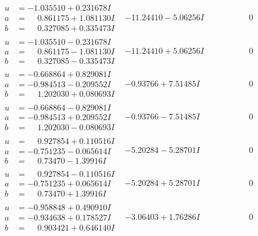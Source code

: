 \documentclass[1p]{elsarticle_modified}
\theoremstyle{definition}
\begin{document}
$$\begin{array}{c|c|c}
\begin{aligned}
u &= -1.035510 + 0.231678 I \\
a &= \phantom{-}0.861175 + 1.081130 I \\
b &= \phantom{-}0.327085 + 0.335473 I\end{aligned}
 & -11.24410 - 5.06256 I & \phantom{-0.000000 } 0 \\ \hline\begin{aligned}
u &= -1.035510 - 0.231678 I \\
a &= \phantom{-}0.861175 - 1.081130 I \\
b &= \phantom{-}0.327085 - 0.335473 I\end{aligned}
 & -11.24410 + 5.06256 I & \phantom{-0.000000 } 0 \\ \hline\begin{aligned}
u &= -0.668864 + 0.829081 I \\
a &= -0.984513 - 0.209552 I \\
b &= \phantom{-}1.202030 + 0.080693 I\end{aligned}
 & -0.93766 + 7.51485 I & \phantom{-0.000000 } 0 \\ \hline\begin{aligned}
u &= -0.668864 - 0.829081 I \\
a &= -0.984513 + 0.209552 I \\
b &= \phantom{-}1.202030 - 0.080693 I\end{aligned}
 & -0.93766 - 7.51485 I & \phantom{-0.000000 } 0 \\ \hline\begin{aligned}
u &= \phantom{-}0.927854 + 0.110516 I \\
a &= -0.751235 - 0.065614 I \\
b &= \phantom{-}0.73470 - 1.39916 I\end{aligned}
 & -5.20284 - 5.28701 I & \phantom{-0.000000 } 0 \\ \hline\begin{aligned}
u &= \phantom{-}0.927854 - 0.110516 I \\
a &= -0.751235 + 0.065614 I \\
b &= \phantom{-}0.73470 + 1.39916 I\end{aligned}
 & -5.20284 + 5.28701 I & \phantom{-0.000000 } 0 \\ \hline\begin{aligned}
u &= -0.958848 + 0.490910 I \\
a &= -0.934638 + 0.178527 I \\
b &= \phantom{-}0.903421 + 0.646140 I\end{aligned}
 & -3.06403 + 1.76286 I & \phantom{-0.000000 } 0 \\ \hline\begin{aligned}

\end{aligned}
\end{array}$$
\end{document}
